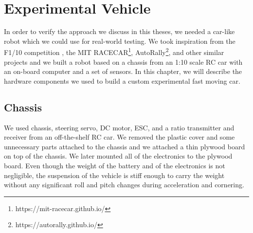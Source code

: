 \chapter{Experimental Vehicle}

In order to verify the approach we discuss in this theses, we needed a car-like robot which we could use for real-world testing. We took inspiration from the F1/10 competition \cite{F1/10}, the MIT RACECAR\footnote{https://mit-racecar.github.io/}, AutoRally\footnote{https://autorally.github.io/}, and other similar projects and we built a robot based on a chassis from an 1:10 scale \gls{RC} car with an on-board computer and a set of sensors. In this chapter, we will describe the hardware components we used to build a custom experimental fast moving car.

\section{Chassis}

We used chassis, steering servo, \gls{DC} motor, \gls{ESC}, and a ratio transmitter and receiver from an off-the-shelf \gls*{RC} car. We removed the plastic cover and some unnecessary parts attached to the chassis and we attached a thin plywood board on top of the chassis. We later mounted all of the electronics to the plywood board. Even though the weight of the battery and of the electronics is not negligible, the suspension of the vehicle is stiff enough to carry the weight without any significant roll and pitch changes during acceleration and cornering.

